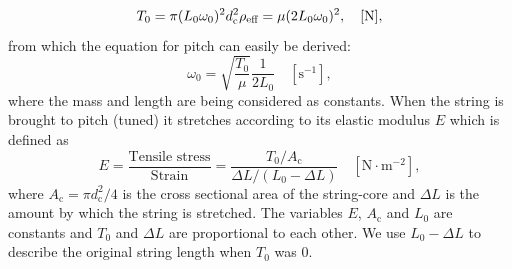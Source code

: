 \documentclass{article}
\begin{document}
\begin{sloppy}
\begin{equation}\label{eq:tension}
    T_0 = \pi (L_0\omega_0)^2d_\text{c}^2\rho_{\textup{eff}} = \mu(2L_0\omega_0)^2, \quad [\text{N}],
\end{equation}
from which the equation for pitch can easily be derived:
\begin{equation}
    \omega_0 = \sqrt{\frac{T_0}{\mu}} \frac{1}{2L_0} \quad [\text{s}^{-1}],
\end{equation}
where the mass and length are being considered as constants. 
When the string is brought to pitch (tuned) it stretches according to its elastic modulus $E$ which is defined as
%
\begin{equation}\label{eq:tensile_stress}
    E = \frac{\text{Tensile stress}}{\text{Strain}}
    = \frac{T_0/A_\text{c}}{\Delta L/(L_0 - \Delta L)} \quad [\text{N}\cdot\text{m}^{-2}], 
\end{equation}
%
where $A_\text{c} = \pi d_\text{c}^2/4$ is the cross sectional area of the string-core and $\Delta L$ is the amount by which the string is stretched. The variables $E$, $A_\text{c}$ and $L_0$ are constants and $T_0$ and $\Delta L$ are proportional to each other. We use $L_0 - \Delta L$ to describe the original string length when $T_0$ was 0.
%
%
%
%

\end{sloppy}
\end{document}
